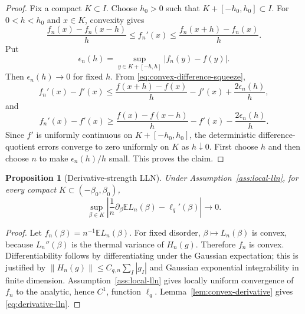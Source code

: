 \documentclass[11pt]{article}
\newtheorem{proposition}[theorem]{Proposition}
\newcommand{\E}{\mathbb{E}}
\newcommand{\norm}[1]{\left\lVert #1\right\rVert}
\begin{document}
\begin{proof}
  Fix a compact $K\subset I$.  Choose $h_0>0$ such that
  $K+[-h_0,h_0]\subset I$.  For $0<h<h_0$ and $x\in K$, convexity gives
  \begin{equation}\label{eq:convex-difference-squeeze}
    \frac{f_n(x)-f_n(x-h)}{h}
    \leq f_n'(x)
    \leq
    \frac{f_n(x+h)-f_n(x)}{h}.
  \end{equation}
  Put
  \begin{equation}\label{eq:epsilon-nh}
    \epsilon_n(h)=\sup_{y\in K+[-h,h]}|f_n(y)-f(y)|.
  \end{equation}
  Then $\epsilon_n(h)\to0$ for fixed $h$.  From
  \eqref{eq:convex-difference-squeeze},
  \begin{equation}\label{eq:upper-convex-derivative}
    f_n'(x)-f'(x)
    \leq
    \frac{f(x+h)-f(x)}{h}-f'(x)
    +\frac{2\epsilon_n(h)}{h},
  \end{equation}
  and
  \begin{equation}\label{eq:lower-convex-derivative}
    f_n'(x)-f'(x)
    \geq
    \frac{f(x)-f(x-h)}{h}-f'(x)
    -\frac{2\epsilon_n(h)}{h}.
  \end{equation}
  Since $f'$ is uniformly continuous on $K+[-h_0,h_0]$, the deterministic
  difference-quotient errors converge to zero uniformly on $K$ as $h\downarrow0$.
  First choose $h$ and then choose $n$ to make $\epsilon_n(h)/h$ small.  This
  proves the claim.
\end{proof}

\begin{proposition}[Derivative-strength LLN]
  \label{prop:derivative-lln-from-lln}
  Under Assumption~\ref{ass:local-lln}, for every compact
  $K\subset(-\beta_0,\beta_0)$,
  \begin{equation}\label{eq:derivative-lln}
    \sup_{\beta\in K}
    \left|
      \frac1n\partial_\beta\E L_n(\beta)-\ell_q'(\beta)
    \right|
    \to0.
  \end{equation}
\end{proposition}

\begin{proof}
  Let $f_n(\beta)=n^{-1}\E L_n(\beta)$.  For fixed disorder,
  $\beta\mapsto L_n(\beta)$ is convex, because $L_n''(\beta)$ is the thermal
  variance of $H_n(g)$.  Therefore $f_n$ is convex.  Differentiability follows
  by differentiating under the Gaussian expectation; this is justified by
  $\norm{H_n(g)}\leq C_{q,n}\sum_I|g_I|$ and Gaussian exponential
  integrability in finite dimension.  Assumption~\ref{ass:local-lln} gives
  locally uniform convergence of $f_n$ to the analytic, hence $C^1$, function
  $\ell_q$.  Lemma~\ref{lem:convex-derivative} gives
  \eqref{eq:derivative-lln}.
\end{proof}
\end{document}
